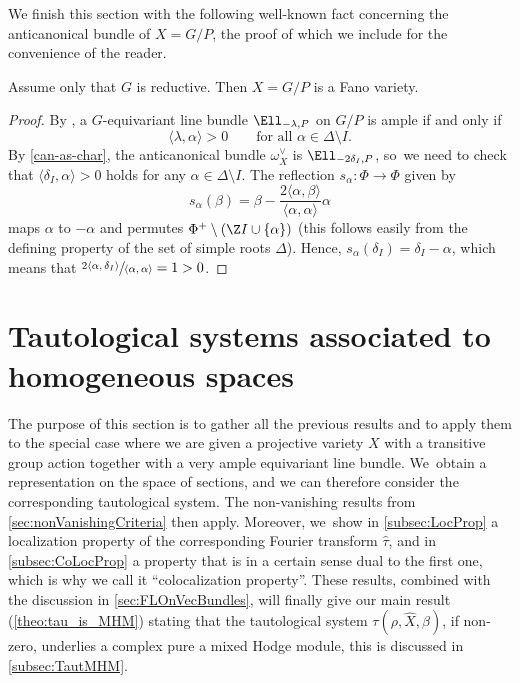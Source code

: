 We finish this section with the following well-known fact concerning the anticanonical bundle of $X=G/P$, the proof of which we include for the convenience of the reader.

\begin{lem}\label{lem:Fano}
Assume only that $G$ is reductive. Then $X=G/P$ is a Fano variety.
\end{lem}

\begin{proof}
By \cite[II.4.4]{Jantzen}, a $G$-equivariant line bundle $\Ell_{-\lambda,P}$ on $G/P$ is ample if and only if
\[
\langle \lambda, \alpha \rangle > 0 \qquad \text{for all $\alpha \in \Delta \setminus I$}.
\]
By \cref{can-as-char}, the anticanonical bundle $\omega_X^{\vee}$ is $\Ell_{-2\delta_I,P}$, so~we need to check that $\langle \delta_I, \alpha \rangle > 0$ holds for any $\alpha \in \Delta \setminus I$. The reflection $s_\alpha \colon \Phi \to \Phi$ given by
\[
s_\alpha(\beta) = \beta-\frac{2\langle \alpha, \beta \rangle}{\langle \alpha, \alpha \rangle} \alpha
\]
maps $\alpha$ to $-\alpha$ and permutes $\Phi^+ \setminus (\Z I \cup \{\alpha\})$ (this follows easily from the defining property of the set of simple roots $\Delta$). Hence, $s_\alpha(\delta_I) = \delta_I - \alpha$, which means that $\sfrac{2\langle \alpha, \delta_I\rangle}{\langle \alpha, \alpha \rangle} = 1 > 0$.
\end{proof}

\section{Tautological systems associated to homogeneous spaces} \label{sec:tautologicalSystems}

The purpose of this section is to gather all the previous results and to apply them to the special case where we are given a projective variety $X$ with a transitive group action together with a very ample equivariant line bundle. We~obtain a representation on the space of sections, and we can therefore consider the corresponding tautological system. The non-vanishing results from \cref{sec:nonVanishingCriteria} then apply. Moreover, we~show in \cref{subsec:LocProp} a localization property of the corresponding Fourier transform $\hat{\tau}$, and in \cref{subsec:CoLocProp} a property that is in a certain sense dual to the first one, which is why we call it ``colocalization property''. These results, combined with the discussion in \cref{sec:FLOnVecBundles}, will finally give our main result
(\cref{theo:tau_is_MHM}) stating that the tautological system $\tau(\rho,\hat{X},\beta)$, if non-zero, underlies a complex pure \resp a mixed Hodge module, this is discussed in \cref{subsec:TautMHM}.

